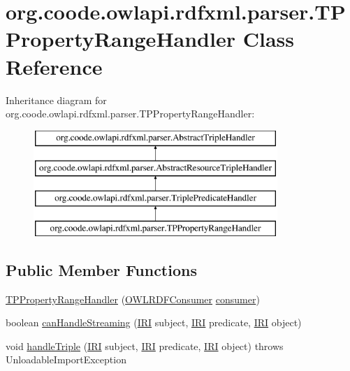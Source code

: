 \hypertarget{classorg_1_1coode_1_1owlapi_1_1rdfxml_1_1parser_1_1_t_p_property_range_handler}{\section{org.\-coode.\-owlapi.\-rdfxml.\-parser.\-T\-P\-Property\-Range\-Handler Class Reference}
\label{classorg_1_1coode_1_1owlapi_1_1rdfxml_1_1parser_1_1_t_p_property_range_handler}
}
Inheritance diagram for org.\-coode.\-owlapi.\-rdfxml.\-parser.\-T\-P\-Property\-Range\-Handler\-:\begin{figure}[H]
\begin{center}
\leavevmode
\includegraphics[height=4.000000cm]{classorg_1_1coode_1_1owlapi_1_1rdfxml_1_1parser_1_1_t_p_property_range_handler}
\end{center}
\end{figure}
\subsection*{Public Member Functions}
\begin{DoxyCompactItemize}
\item 
\hyperlink{classorg_1_1coode_1_1owlapi_1_1rdfxml_1_1parser_1_1_t_p_property_range_handler_adb6ecc9afd3ae842f7426dd864d54b21}{T\-P\-Property\-Range\-Handler} (\hyperlink{classorg_1_1coode_1_1owlapi_1_1rdfxml_1_1parser_1_1_o_w_l_r_d_f_consumer}{O\-W\-L\-R\-D\-F\-Consumer} \hyperlink{classorg_1_1coode_1_1owlapi_1_1rdfxml_1_1parser_1_1_abstract_triple_handler_a4ccf4d898ff01eb1cadfa04b23d54e9c}{consumer})
\item 
boolean \hyperlink{classorg_1_1coode_1_1owlapi_1_1rdfxml_1_1parser_1_1_t_p_property_range_handler_ae4047c54234296bbc32a5dd581a7be51}{can\-Handle\-Streaming} (\hyperlink{classorg_1_1semanticweb_1_1owlapi_1_1model_1_1_i_r_i}{I\-R\-I} subject, \hyperlink{classorg_1_1semanticweb_1_1owlapi_1_1model_1_1_i_r_i}{I\-R\-I} predicate, \hyperlink{classorg_1_1semanticweb_1_1owlapi_1_1model_1_1_i_r_i}{I\-R\-I} object)
\item 
void \hyperlink{classorg_1_1coode_1_1owlapi_1_1rdfxml_1_1parser_1_1_t_p_property_range_handler_a6ec70c22ed38bcefd5b94744ba460026}{handle\-Triple} (\hyperlink{classorg_1_1semanticweb_1_1owlapi_1_1model_1_1_i_r_i}{I\-R\-I} subject, \hyperlink{classorg_1_1semanticweb_1_1owlapi_1_1model_1_1_i_r_i}{I\-R\-I} predicate, \hyperlink{classorg_1_1semanticweb_1_1owlapi_1_1model_1_1_i_r_i}{I\-R\-I} object)  throws Unloadable\-Import\-Exception 
\end{DoxyCompactItemize}
